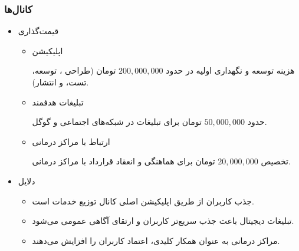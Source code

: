 \documentclass[dvipsnames, svgnames, x11names, 11pt]{article}
\begin{document}
\subsubsection{کانال‌ها }
\begin{itemize}
\item 
قیمت‌گذاری
\begin{itemize}
\item 
اپلیکیشن

هزینه توسعه و نگهداری اولیه در حدود
$200,000,000$
تومان (طراحی ، توسعه، تست، و انتشار).

\item 
تبلیغات هدفمند

حدود
$50,000,000$
تومان برای تبلیغات در شبکه‌های اجتماعی و گوگل.

\item 
ارتباط با مراکز درمانی

تخصیص
$20,000,000$
تومان برای هماهنگی و انعقاد قرارداد با مراکز درمانی.
\end{itemize}

\item 
دلایل
\begin{itemize}
\item 
جذب کاربران از طریق اپلیکیشن اصلی کانال توزیع خدمات است.

\item 
تبلیغات دیجیتال باعث جذب سریع‌تر کاربران و ارتقای آگاهی عمومی می‌شود.

\item 
مراکز درمانی به عنوان همکار کلیدی، اعتماد کاربران را افزایش می‌دهند.
\end{itemize}
\end{itemize}
\end{document}
